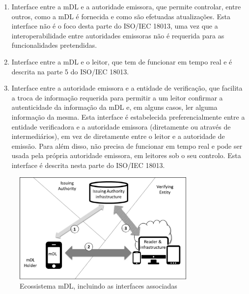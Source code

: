 \begin{enumerate}
	\item Interface entre a mDL e a autoridade emissora, que permite controlar, entre outros, como a mDL é fornecida e como são efetuadas atualizações. Esta interface não é o foco desta parte do ISO/IEC 18013, uma vez que a interoperabilidade entre autoridades emissoras não é requerida para as funcionalidades pretendidas.
	\item Interface entre a mDL e o leitor, que tem de funcionar em tempo real e é descrita na parte 5 do ISO/IEC 18013.
	\item Interface entre a autoridade emissora e a entidade de verificação, que facilita a troca de informação requerida para permitir a um leitor confirmar a autenticidade da informação da mDL e, em alguns casos, ler alguma informação da mesma. Esta interface é estabelecida preferencialmente entre a entidade verificadora e a autoridade emissora (diretamente ou através de intermediários), em vez de diretamente entre o leitor e a autoridade de emissão. Para além disso, não precisa de funcionar em tempo real e pode ser usada pela própria autoridade emissora, em leitores sob o seu controlo. Esta interface é descrita nesta parte do ISO/IEC 18013.
\end{enumerate}

\begin{figure}[H]
	\centering
	\includegraphics[width=0.8\textwidth]{images/interfaces.png}
	\caption{Ecossistema mDL, incluindo as interfaces associadas}
	\label{fig:interfaces}
\end{figure}
